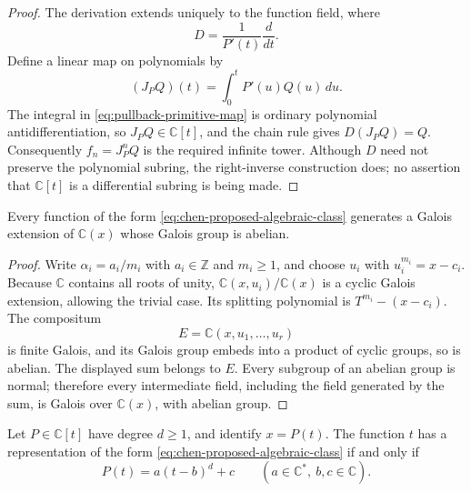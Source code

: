 \begin{proof}
The derivation extends uniquely to the function field, where
\[
 D=\frac1{P'(t)}\frac d{dt}.
\]
Define a linear map on polynomials by
\begin{equation}\label{eq:pullback-primitive-map}
 (J_PQ)(t)=\int_0^t P'(u)Q(u)\,du.
\end{equation}
The integral in \eqref{eq:pullback-primitive-map} is ordinary polynomial
antidifferentiation, so $J_PQ\in\mathbb C[t]$, and the chain rule gives
$D(J_PQ)=Q$. Consequently $f_n=J_P^nQ$ is the required infinite tower.
Although $D$ need not preserve the polynomial subring, the right-inverse
construction does; no assertion that $\mathbb C[t]$ is a differential subring
is being made.
\end{proof}

\begin{proposition}
\label{prop:abelian-obstruction}
Every function of the form \eqref{eq:chen-proposed-algebraic-class} generates
a Galois extension of $\mathbb C(x)$ whose Galois group is abelian.
\end{proposition}

\begin{proof}
Write $\alpha_i=a_i/m_i$ with $a_i\in\mathbb Z$ and $m_i\ge1$, and choose
$u_i$ with $u_i^{m_i}=x-c_i$. Because $\mathbb C$ contains all roots of unity,
$\mathbb C(x,u_i)/\mathbb C(x)$ is a cyclic Galois extension, allowing the
trivial case. Its splitting polynomial is $T^{m_i}-(x-c_i)$. The compositum
\[
 E=\mathbb C(x,u_1,\ldots,u_r)
\]
is finite Galois, and its Galois group embeds into a product of cyclic groups,
so is abelian. The displayed sum belongs to $E$. Every subgroup of an abelian
group is normal; therefore every intermediate field, including the field
generated by the sum, is Galois over $\mathbb C(x)$, with abelian group.
\end{proof}

\begin{theorem}
\label{thm:polynomial-inverse-classification}
Let $P\in\mathbb C[t]$ have degree $d\ge1$, and identify $x=P(t)$. The
function $t$ has a representation of the form
\eqref{eq:chen-proposed-algebraic-class} if and only if
\begin{equation}\label{eq:affine-power-polynomial}
 P(t)=a(t-b)^d+c
 \qquad(a\in\mathbb C^*,\ b,c\in\mathbb C).
\end{equation}
\end{theorem}

